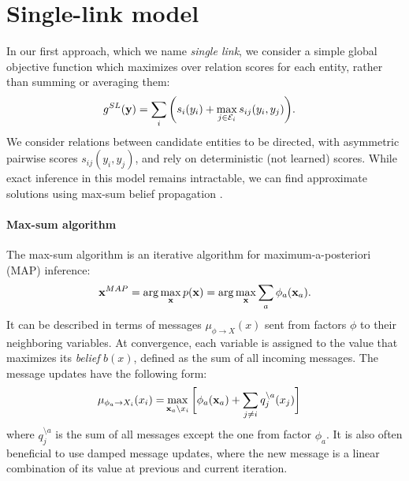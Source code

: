 


\section{Single-link model}

In our first approach, which we name \emph{single link}, we consider a simple global objective function which maximizes over relation scores for each entity, rather than summing or averaging them:
\begin{align}
g^{SL}({\bf y}) &= \sum_i \bigg( s_i(y_i) + \max_{ j \in \mathcal{E}_i} s_{ij}(y_i, y_j) \bigg).
\end{align}
We consider relations between candidate entities to be directed, with asymmetric pairwise scores $s_{ij}(y_i, y_j)$, and rely on deterministic (not learned) scores. 
While exact inference in this model remains intractable, we can find approximate solutions using max-sum belief propagation \cite{Kschischang2001}. 

\paragraph{Max-sum algorithm} 
The max-sum algorithm is an iterative algorithm for maximum-a-posteriori (MAP) inference:
\begin{equation}
{\bf x}^{MAP} = \arg \max_{\bf x} p({\bf x}) = \arg \max_{\bf x} \sum_a \phi_a({\bf x}_a).
\end{equation}
 It can be described in terms of messages $\mu_{\phi \rightarrow X}(x)$ sent from factors $\phi$ to their neighboring variables. At convergence, each variable is assigned to the value that maximizes its \emph{belief} $b(x)$, defined as the sum of all incoming messages. The message updates have the following form:
\begin{align}
\mu_{\phi_a \rightarrow X_i}(x_i) =& \max_{ {\bf x}_a \setminus x_i } \bigg[ \phi_a({\bf x}_a) + \sum_{j \neq i} q_j^{\setminus a}(x_j)\bigg]
\label{eq:damping}
\end{align}
\noindent where $q_j^{\setminus a}$ is the sum of all messages except the one from factor $\phi_a$.  It is also often beneficial to use damped message updates, where the new message is a linear combination of its value at previous and current iteration.

